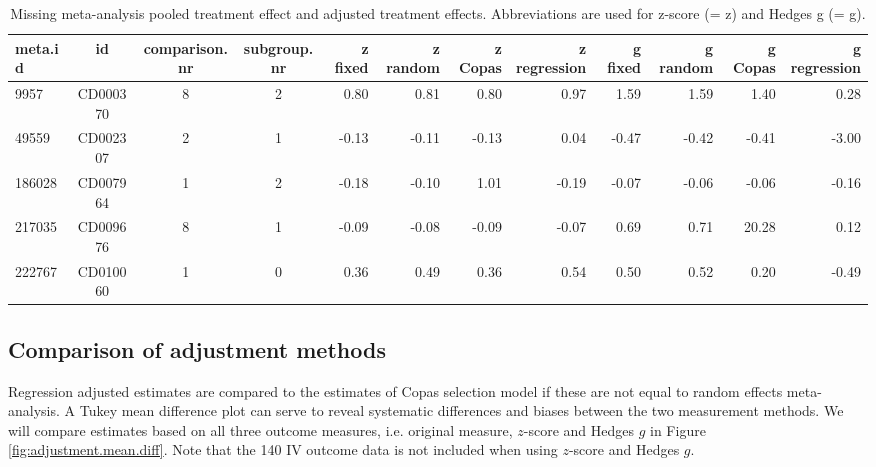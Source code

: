 \documentclass[11pt,a4paper,twoside]{book}\usepackage[]{graphicx}\usepackage[]{color}
\begin{document}
\begin{table}[ht]
\centering
\begingroup\tiny
\begin{tabular}{lcccrrrrrrrr}
  \hline
meta.id & id & comparison.nr & subgroup.nr & z fixed & z random & z Copas & z regression & g fixed & g random & g Copas & g regression \\ 
  \hline
9957 & CD000370 & 8 & 2 & 0.80 & 0.81 & 0.80 & 0.97 & 1.59 & 1.59 & 1.40 & 0.28 \\ 
  49559 & CD002307 & 2 & 1 & -0.13 & -0.11 & -0.13 & 0.04 & -0.47 & -0.42 & -0.41 & -3.00 \\ 
  186028 & CD007964 & 1 & 2 & -0.18 & -0.10 & 1.01 & -0.19 & -0.07 & -0.06 & -0.06 & -0.16 \\ 
  217035 & CD009676 & 8 & 1 & -0.09 & -0.08 & -0.09 & -0.07 & 0.69 & 0.71 & 20.28 & 0.12 \\ 
  222767 & CD010060 & 1 & 0 & 0.36 & 0.49 & 0.36 & 0.54 & 0.50 & 0.52 & 0.20 & -0.49 \\ 
   \hline
\end{tabular}
\endgroup
\caption{Missing meta-analysis pooled treatment effect and adjusted treatment effects. Abbreviations are used for z-score (= z) and Hedges g (= g).} 
\label{missing.differences}
\end{table}




\subsection{Comparison of adjustment methods}
Regression adjusted estimates are compared to the estimates of Copas selection model if these are not equal to random effects meta-analysis. A Tukey mean difference plot can serve to reveal systematic differences and biases between the two measurement methods. We will compare estimates based on all three outcome measures, i.e. original measure, $z$-score and Hedges $g$ in Figure \ref{fig:adjustment.mean.diff}. Note that the 140 IV outcome data is not included when using $z$-score and Hedges $g$.
\end{document}
